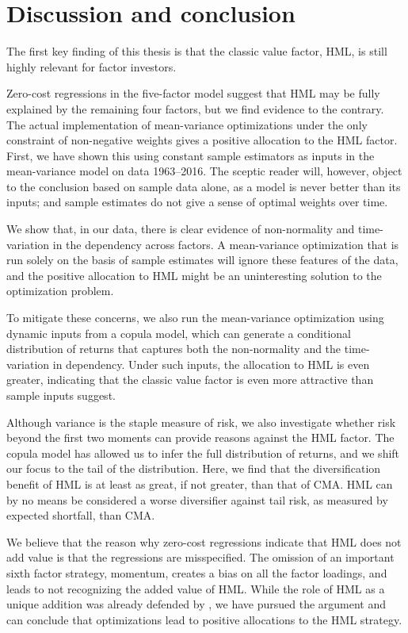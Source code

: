 
\section{Discussion and conclusion} %
\label{sec:discussion_conclusion}

The first key finding of this thesis is that the classic value factor, HML, is still highly relevant for factor investors. 

Zero-cost regressions in the five-factor model suggest that HML may be fully explained by the remaining four factors, but we find evidence to the contrary. The actual implementation of mean-variance optimizations under the only constraint of non-negative weights gives a positive allocation to the HML factor. First, we have shown this using constant sample estimators as inputs in the mean-variance model on data 1963--2016. The sceptic reader will, however, object to the conclusion based on sample data alone, as a model is never better than its inputs; and sample estimates do not give a sense of optimal weights over time.

We show that, in our data, there is clear evidence of non-normality and time-variation in the dependency across factors. A mean-variance optimization that is run solely on the basis of sample estimates will ignore these features of the data, and the positive allocation to HML might be an uninteresting solution to the optimization problem.

To mitigate these concerns, we also run the mean-variance optimization using dynamic inputs from a copula model, which can generate a conditional distribution of returns that captures both the non-normality and the time-variation in dependency. Under such inputs, the allocation to HML is even greater, indicating that the classic value factor is even more attractive than sample inputs suggest.

Although variance is the staple measure of risk, we also investigate whether risk beyond the first two moments can provide reasons against the HML factor. The copula model has allowed us to infer the full distribution of returns, and we shift our focus to the tail of the distribution. Here, we find that the diversification benefit of HML is at least as great, if not greater, than that of CMA. HML can by no means be considered a worse diversifier against tail risk, as measured by expected shortfall, than CMA.

We believe that the reason why zero-cost regressions indicate that HML does not add value is that the regressions are misspecified. The omission of an important sixth factor strategy, momentum, creates a bias on all the factor loadings, and leads to not recognizing the added value of HML. While the role of HML as a unique addition was already defended by \textcite{Asness2015}, we have pursued the argument and can conclude that optimizations lead to positive allocations to the HML strategy.

